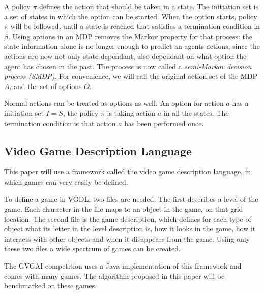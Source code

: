 A policy $\pi$ defines the action that should be taken in a state. The
initiation set is a set of states in which the option can be started. When the
option starts, policy $\pi$ will be followed, until a state is reached that
satisfies a termination condition in $\beta$. Using options in an MDP removes
the Markov property for that process: the state information alone is no longer
enough to predict an agents actions, since the actions are now not only
state-dependant, also dependant on what option the agent has chosen in the past.
The process is now called a \emph{semi-Markov decision process (SMDP)}. For
convenience, we will call the original action set of the MDP $A$, and the set of
options $O$.

Normal actions can be treated as options as well. An option for action $a$ has a
initiation set $I = S$, the policy $\pi$ is taking action $a$ in all the states.
The termination condition is that action $a$ has been performed once.

\subsection{Video Game Description Language}
\label{subsec:vgdl}
This paper will use a framework called the video game description
language\cite{schaul2013video}, in which games can very easily be defined.

To define a game in VGDL, two files are needed. The first describes a level of
the game. Each character in the file maps to an object in the game, on that grid
location. The second file is the game description, which defines for each
type of object what its letter in the level description is, how it looks in the
game, how it interacts with other objects and when it disappears from the game.
Using only these two files a wide spectrum of games can be created.

The GVGAI competition uses a Java implementation of this framework and comes
with many games. The algorithm proposed in this paper will be benchmarked on
these games.

